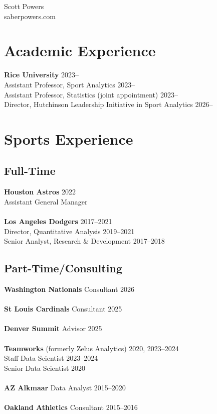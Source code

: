 \documentclass{article}
\begin{document}
\begin{center}
{\huge \sc Scott Powers}\\
saberpowers.com
\end{center}


\section*{\sc Academic Experience}

{\bf Rice University} \hfill 2023--\\
Assistant Professor, Sport Analytics \hfill {\color{gray} 2023--}\\
Assistant Professor, Statistics (joint appointment) \hfill {\color{gray} 2023--}\\
Director, Hutchinson Leadership Initiative in Sport Analytics \hfill {\color{gray} 2026--}

\section*{\sc Sports Experience}

\subsection*{\sc Full-Time}

{\bf Houston Astros} \hfill 2022\\
Assistant General Manager\\
~\\
{\bf Los Angeles Dodgers} \hfill 2017--2021\\
Director, Quantitative Analysis \hfill {\color{gray} 2019--2021}\\
Senior Analyst, Research \& Development \hfill {\color{gray} 2017--2018}

\subsection*{\sc Part-Time/Consulting}

\textbf{Washington Nationals} Consultant \hfill 2026\\
~\\
\textbf{St Louis Cardinals} Consultant \hfill 2025\\
~\\
\textbf{Denver Summit} Advisor \hfill 2025\\
~\\
{\bf Teamworks} (formerly Zelus Analytics) \hfill 2020, 2023--2024\\
Staff Data Scientist \hfill {\color{gray}2023--2024}\\
Senior Data Scientist \hfill {\color{gray}2020}\\
~\\
{\bf AZ Alkmaar} Data Analyst \hfill 2015--2020\\
~\\
{\bf Oakland Athletics} Consultant \hfill 2015--2016
\end{document}
